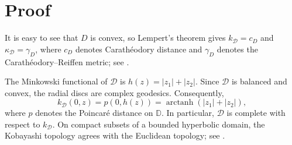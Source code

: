\documentclass[10pt,a4paper]{amsart}
\newcommand{\D}{\mathcal D}
\newcommand{\kD}{k_{\D}}
\newcommand{\kapD}{\kappa_{\D}}
\begin{document}
\section{Proof}
It is easy to see that $D$ is convex, so Lempert’s theorem gives 
$\kD=c_D$ and $\kapD=\gamma_D$, where $c_D$ denotes Carath\'eodory distance and $\gamma_D$ denotes the Carath\'eodory–Reiffen metric; see \cite{JP, Lempert}.

The Minkowski functional of $\D$ is $h(z)=|z_1|+|z_2|$.
Since $\D$ is balanced and convex, the radial discs are complex
geodesics. Consequently,
\begin{equation}\label{eq:radial}
\kD(0,z)
=
p(0,h(z))
=
\operatorname{arctanh}(|z_1|+|z_2|),
\end{equation}
where $p$ denotes the Poincar\'e distance on $\mathbb D$.
In particular, $\D$ is complete with respect to $\kD$. On compact subsets of a bounded
hyperbolic domain, the Kobayashi topology agrees with the Euclidean
topology; see \cite[Proposition 2.6.1]{JP}.
\end{document}
